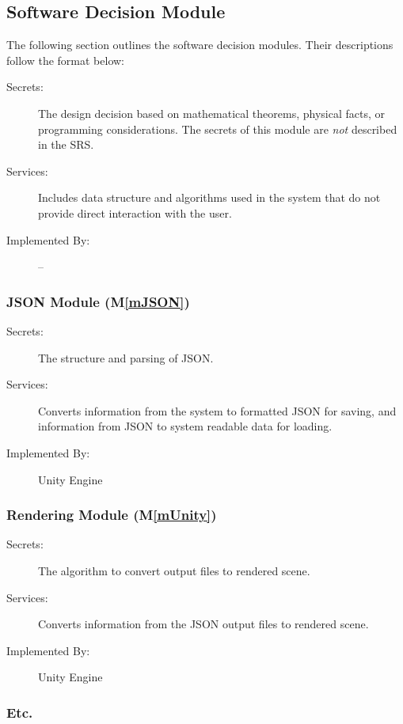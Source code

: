 \documentclass[12pt, titlepage]{article}
\newcommand{\mref}[1]{M\ref{#1}}
\begin{document}
\subsection{Software Decision Module}
The following section outlines the software decision modules. Their 
descriptions follow the format below: 

\begin{description}
	\item[Secrets:] The design decision based on mathematical theorems, physical
	facts, or programming considerations. The secrets of this module are
	\emph{not} described in the SRS.
	\item[Services:] Includes data structure and algorithms used in the system 
	that
	do not provide direct interaction with the user. 
	\item[Implemented By:] --
\end{description}

\subsubsection{JSON Module (\mref{mJSON})}

\begin{description}
	\item[Secrets:]The structure and parsing of JSON.
	\item[Services:]Converts information from the system to formatted JSON for 
	saving, and information from JSON to system readable data for loading.
	\item[Implemented By:] Unity Engine
\end{description}

\subsubsection{Rendering Module (\mref{mUnity})}

\begin{description}
	\item[Secrets:]The algorithm to convert output files to rendered scene.
	\item[Services:]Converts information from the JSON output files to rendered 
	scene.
	\item[Implemented By:] Unity Engine
\end{description}

\subsubsection{Etc.}
\end{document}
